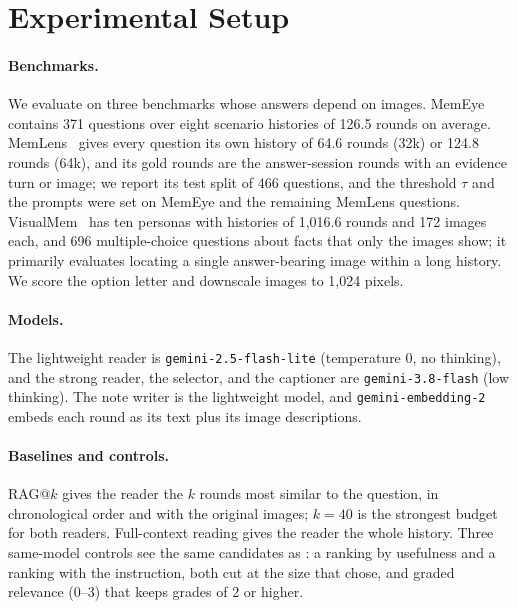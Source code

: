 \section{Experimental Setup}
\label{sec:setup}

\paragraph{Benchmarks.} We evaluate on three benchmarks whose answers depend on images. MemEye~\citep{guo2026memeye} contains 371 questions over eight scenario histories of 126.5 rounds on average. MemLens~\citep{ren2026memlens} gives every question its own history of 64.6 rounds (32k) or 124.8 rounds (64k), and its gold rounds are the answer-session rounds with an evidence turn or image; we report its test split of 466 questions, and the threshold $\tau$ and the prompts were set on MemEye and the remaining MemLens questions. VisualMem~\citep{nguyen2026personalvisual} has ten personas with histories of 1,016.6 rounds and 172 images each, and 696 multiple-choice questions about facts that only the images show; it primarily evaluates locating a single answer-bearing image within a long history. We score the option letter and downscale images to 1,024 pixels.

\paragraph{Models.} The lightweight reader is \texttt{gemini-2.5-flash-lite} (temperature 0, no thinking), and the strong reader, the selector, and the captioner are \texttt{gemini-3.8-flash} (low thinking). The note writer is the lightweight model, and \texttt{gemini-embedding-2} embeds each round as its text plus its image descriptions.

\paragraph{Baselines and controls.} RAG@$k$ gives the reader the $k$ rounds most similar to the question, in chronological order and with the original images; $k{=}40$ is the strongest budget for both readers. Full-context reading gives the reader the whole history. Three same-model controls see the same candidates as \qss{}: a ranking by usefulness and a ranking with the \qss{} instruction, both cut at the size that \qss{} chose, and graded relevance (0--3) that keeps grades of 2 or higher.

